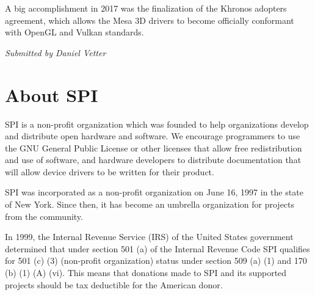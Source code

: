 \documentclass[a4paper]{report}
\begin{document}
A big accomplishment in 2017 was the finalization of the Khronos
adopters agreement, which allows the Mesa 3D drivers to become
officially conformant with OpenGL and Vulkan standards.

{\em Submitted by Daniel Vetter}


\appendix
\chapter{About SPI}

SPI is a non-profit organization which was founded to help organizations
develop and distribute open hardware and software. We encourage programmers
to use the GNU General Public License or other licenses that allow free
redistribution and use of software, and hardware developers to distribute
documentation that will allow device drivers to be written for their product.

SPI was incorporated as a non-profit organization on June 16, 1997 in the state
of New York. Since then, it has become an umbrella organization for projects
from the community.

In 1999, the Internal Revenue Service (IRS) of the United States government
determined that under section 501 (a) of the Internal Revenue Code SPI
qualifies for 501 (c) (3) (non-profit organization) status under section 509
(a) (1) and 170 (b) (1) (A) (vi). This means that donations made to SPI and its
supported projects should be tax deductible for the American donor.

\newpage

\pagestyle{empty}


\null
\end{document}
